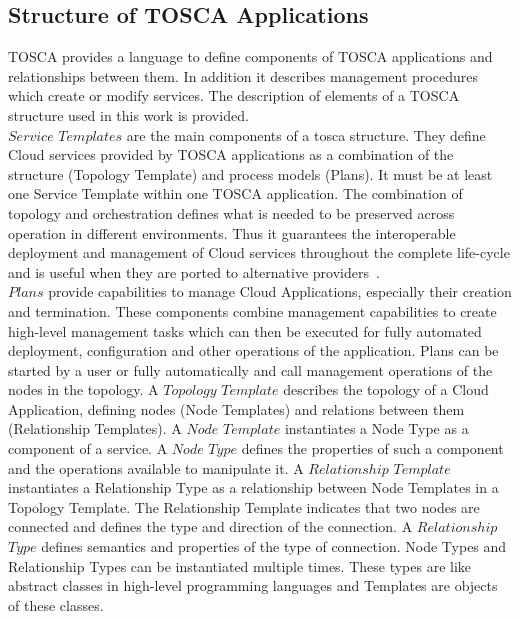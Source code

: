 \subsection*{Structure of TOSCA Applications}
TOSCA provides a language to define components of TOSCA applications and relationships between them. %
In addition it describes  management procedures which create or modify services. %
The description of elements of a TOSCA structure used in this work is provided. \\
$Service$ $Templates$ are the main components of a \gls{tosca} structure. 
They define Cloud services provided by TOSCA applications as a combination of the structure (Topology Template) and process models (Plans).
It must be at least one Service Template within one TOSCA application.
The combination of topology and orchestration defines what is needed to be preserved across operation in different environments.
Thus it guarantees the interoperable deployment and management of Cloud services throughout the complete life-cycle and is useful when they are ported to alternative providers~\cite{TOSCA-v1.0_book}. \\ %
$Plans$ provide capabilities to manage Cloud Applications, especially their creation and termination.
These components combine management capabilities to create high-level management tasks which can then be executed for fully automated deployment, configuration and other operations of the application.
Plans can be started by a user or fully automatically and call management operations of the nodes in the topology. %
A $Topology$ $Template$ describes the topology of a Cloud Application, defining nodes (Node Templates) and relations between them (Relationship Templates). %
A $Node$ $Template$ instantiates a Node Type as a component of a service. 
A $Node$ $Type$ defines the properties of such a component and the operations available to manipulate it.
A $Relationship$ $Template$ instantiates a Relationship Type as a relationship between Node Templates in a Topology Template. 
The Relationship Template indicates that two nodes are connected and defines the type and direction of the connection.
A $Relationship$ $Type$ defines semantics and properties of the type of connection.\label{subs:reltype} %
Node Types and Relationship Types can be instantiated multiple times.
These types are like abstract classes in high-level programming languages and Templates are objects of these classes.\\
